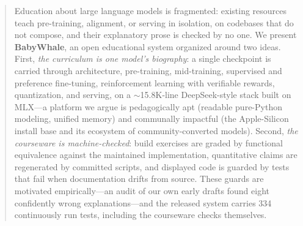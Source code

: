 \begin{abstract}
Education about large language models is fragmented: existing resources teach
pre-training, alignment, or serving in isolation, on codebases that do not
compose, and their explanatory prose is checked by no one. We present
\textbf{BabyWhale}, an open educational system organized around two ideas.
First, \emph{the curriculum is one model's biography}: a single checkpoint is
carried through architecture, pre-training, mid-training, supervised and
preference fine-tuning, reinforcement learning with verifiable rewards,
quantization, and serving, on a $\sim$15.8K-line DeepSeek-style stack built on
MLX---a platform we argue is pedagogically apt (readable pure-Python modeling,
unified memory) and communally impactful (the Apple-Silicon install base and
its ecosystem of community-converted models). Second, \emph{the courseware is
machine-checked}: build exercises are graded by functional equivalence against
the maintained implementation, quantitative claims are regenerated by committed
scripts, and displayed code is guarded by tests that fail when documentation
drifts from source. These guards are motivated empirically---an audit of our
own early drafts found eight confidently wrong explanations---and the released
system carries 334 continuously run tests, including the courseware checks
themselves.
\end{abstract}
